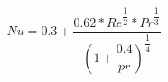 \documentclass[compileTAMUreport.tex]{subfiles}
\begin{document}
\begin{equation}
Nu = 0.3 + \dfrac{0.62*Re^{\dfrac{1}{2}}*Pr^{\dfrac{1}{3}}}{\left( 1+{{\dfrac{0.4}{pr}}}\right) ^{\dfrac{1}{4}}  } 
\end{equation}
\end{document}
